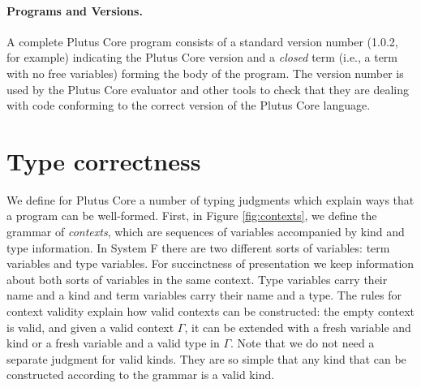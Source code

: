 \documentclass[a4paper]{article}
\begin{document}
\paragraph{Programs and Versions.} A complete Plutus Core program
consists of a standard version number (1.0.2, for example) indicating
the Plutus Core version and a \textit{closed} term (i.e., a term with no
free variables) forming the body of the program.  The version number
is used by the Plutus Core evaluator and other tools to check that
they are dealing with code conforming to the correct version of the
Plutus Core language.

\section{Type correctness}

We define for Plutus Core a number of typing judgments which explain
ways that a program can be well-formed. First, in Figure
\ref{fig:contexts}, we define the grammar of \textit{contexts},
which are sequences of variables accompanied by kind and type
information. In System F there are two different sorts of variables:
term variables and type variables. For succinctness of presentation we
keep information about both sorts of variables in the same
context. Type variables carry their name and a kind and term variables
carry their name and a type. The rules for context validity explain
how valid contexts can be constructed: the empty context is valid, and
given a valid context $\Gamma$, it can be extended with a fresh
variable and kind or a fresh variable and a valid type in
$\Gamma$. Note that we do not need a separate judgment for valid
kinds. They are so simple that any kind that can be constructed
according to the grammar is a valid kind.

\end{document}
